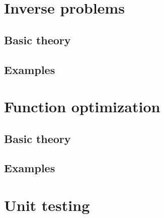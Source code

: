 \documentclass[pdftex, a4paper, 10pt]{book}
\begin{document}
 
\chapter{Inverse problems}\label{InverseProblems}


\section{Basic theory}\label{BasicTheoryInverseProblems}


\section{Examples}\label{ExamplesInverseProblems}


 
\chapter{Function optimization}\label{FunctionOptimization}


\section{Basic theory}\label{BasicTheoryFunctionOptimization}

 
\section{Examples}\label{FunctionOptimizationExamples}

 

\appendix

\chapter{Unit testing}\label{UnitTesting}




\end{document}

